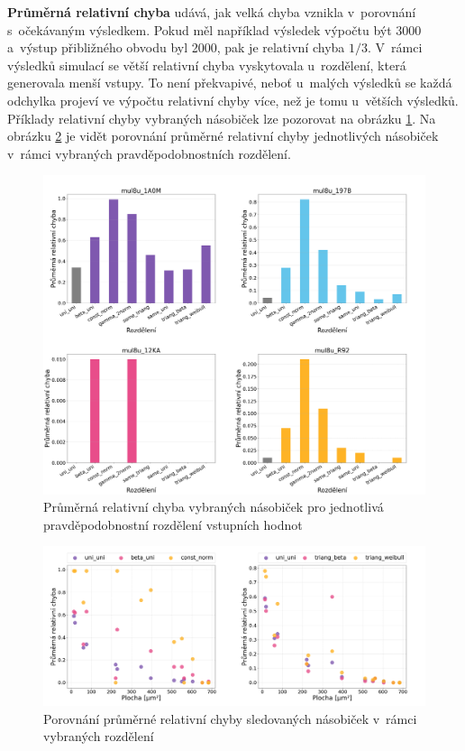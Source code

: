 \textbf{Průměrná relativní chyba} udává, jak velká chyba vznikla v~porovnání s~očekávaným výsledkem. Pokud měl například výsledek výpočtu být 3000 a~výstup přibližného obvodu byl 2000, pak je relativní chyba $1/3$. 
V~rámci výsledků simulací se větší relativní chyba vyskytovala u~rozdělení, která generovala menší vstupy. To není překvapivé, neboť u~malých výsledků se každá odchylka projeví ve výpočtu relativní chyby více, než je tomu u~větších výsledků. Příklady relativní chyby vybraných násobiček lze pozorovat na obrázku \ref{fig:metrics_mean_relative_error}. Na obrázku \ref{fig:scatter_mean_relative_error} je vidět porovnání průměrné relativní chyby jednotlivých násobiček v~rámci vybraných pravděpodobnostních rozdělení.

\begin{figure}[H]
    \centering
    \includegraphics[width=\textwidth]{obrazky-figures/metrics_mean_relative_error.png}
    \caption{Průměrná relativní chyba vybraných násobiček pro jednotlivá pravděpodobnostní rozdělení vstupních hodnot}
    \label{fig:metrics_mean_relative_error}
\end{figure}

\begin{figure}[H]
    \centering
    \includegraphics[width=\textwidth]{obrazky-figures/scatter_mean_relative_error.png}
    \caption{Porovnání průměrné relativní chyby sledovaných násobiček v~rámci vybraných rozdělení}
    \label{fig:scatter_mean_relative_error}
\end{figure}

